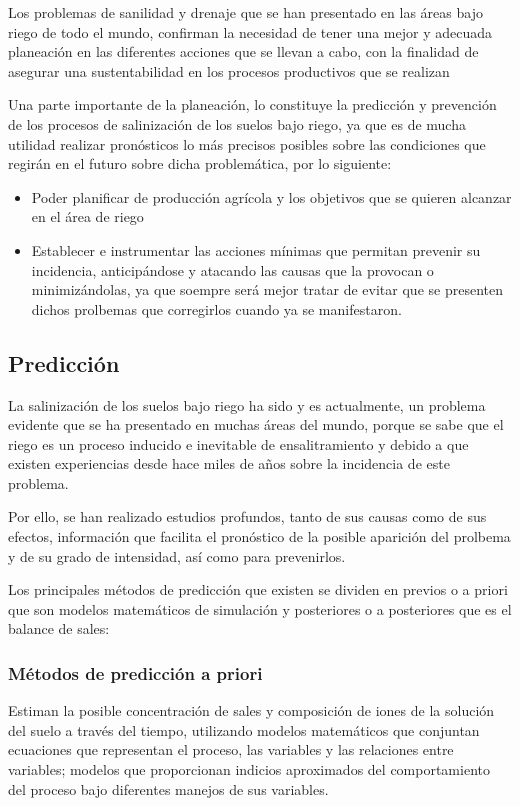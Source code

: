Los problemas de sanilidad y drenaje que se han presentado en las áreas bajo riego de todo el mundo, confirman la necesidad de tener una mejor y adecuada planeación en las diferentes acciones que se llevan a cabo, con la finalidad de asegurar una sustentabilidad en los procesos productivos que se realizan

Una parte importante de la planeación, lo constituye la predicción y prevención de los procesos de salinización de los suelos bajo riego, ya que es de mucha utilidad realizar pronósticos lo más precisos posibles sobre las condiciones que regirán en el futuro sobre dicha problemática, por lo siguiente:
\begin{itemize}
    \item Poder planificar de producción agrícola y los objetivos que se quieren alcanzar en el área de riego
    \item Establecer e instrumentar las acciones mínimas que permitan prevenir su incidencia, anticipándose y atacando las causas que la provocan o minimizándolas, ya que soempre será mejor tratar de evitar que se presenten dichos prolbemas que corregirlos cuando ya se manifestaron.
\end{itemize}
\subsection{Predicción}
La salinización de los suelos bajo riego ha sido y es actualmente, un problema evidente que se ha presentado en muchas áreas del mundo, porque se sabe que el riego es un proceso inducido e inevitable de ensalitramiento y debido a que existen experiencias desde hace miles de años sobre la incidencia de este problema.

Por ello, se han realizado estudios profundos, tanto de sus causas como de sus efectos, información que facilita el pronóstico de la posible aparición del prolbema y de su grado de intensidad, así como para prevenirlos.

Los principales métodos de predicción que existen se dividen en previos o a priori que son modelos matemáticos de simulación y posteriores o a posteriores que es el balance de sales:

\subsubsection{Métodos de predicción a priori} 
Estiman la posible concentración de sales y composición de iones de la solución del suelo a través del tiempo, utilizando modelos matemáticos que conjuntan ecuaciones que representan el proceso, las variables y las relaciones entre variables; modelos que proporcionan indicios aproximados del comportamiento del proceso bajo diferentes manejos de sus variables.

